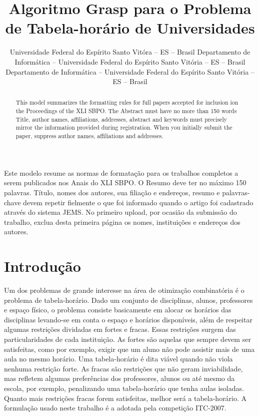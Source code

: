 \documentclass[11pt]{article}
\title{Algoritmo Grasp para o Problema de Tabela-horário de Universidades}
\author{\sbpoauthor{Walace S. Rocha}
                   {Universidade Federal do Espírito Santo}
                   {Vitóra -- ES -- Brasil}
                   {\email{walacesrocha@yahoo.com.br}}
        \sbpoauthor{Maria C. S. Boeres}
                   {Departamento de Informática -- Universidade Federal do Espírito Santo}
                   {Vitória -- ES -- Brasil}
                   {\email{boeres@inf.ufes.br}}
        \sbpoauthor{Maria C. Rangel}
                   {Departamento de Informática -- Universidade Federal do Espírito Santo}
                   {Vitória -- ES -- Brasil}
                   {\email{crangel@inf.ufes.br}}}
\begin{document}
 

\maketitle


\begin{resumo} 
  Este modelo resume as normas de formatação para os trabalhos completos a serem publicados nos Anais do XLI SBPO. O Resumo deve ter no máximo 150 palavras. Título, nomes dos autores, sua filiação e endereços, resumo e palavras-chave devem repetir fielmente o que foi informado quando o artigo foi cadastrado através do sistema JEMS. No primeiro upload, por ocasião da submissão do trabalho, exclua desta primeira página os nomes, instituições e endereços dos autores.
\end{resumo}


\begin{abstract}
  This model summarizes the formatting rules for full papers accepted for inclusion ion the Proceedings of the XLI SBPO. The Abstract must have no more than 150 words Title, author names, affiliations, addresses, abstract and keywords must precisely mirror the information provided during registration. When you initially submit the paper, suppress author names, affiliations and addresses.
\end{abstract}

\newpage
 
\section{Introdução}

Um dos problemas de grande interesse na área de otimização combinatória é o problema de tabela-horário. Dado um conjunto de disciplinas, alunos, professores e espaço físico, o problema consiste basicamente em alocar os horários das disciplinas levando-se em conta o espaço e horários disponíveis, além de respeitar algumas restrições dividadas em fortes e fracas. Essas restrições surgem das particularidades de cada instituição. As fortes são aquelas que sempre devem ser satisfeitas, como por exemplo, exigir que um aluno não pode assistir mais de uma aula no mesmo horário. Uma tabela-horário é dita viável quando não viola nenhuma restrição forte. As fracas são restrições que não geram inviabilidade, mas refletem algumas preferências dos professores, alunos ou até mesmo da escola, por exemplo, penalizando uma tabela-horário que tenha aulas isoladas. Quanto mais restrições fracas forem satisfeitas, melhor será a tabela-horário. A formulação usado neste trabalho é a adotada pela competição ITC-2007.
\end{document}
